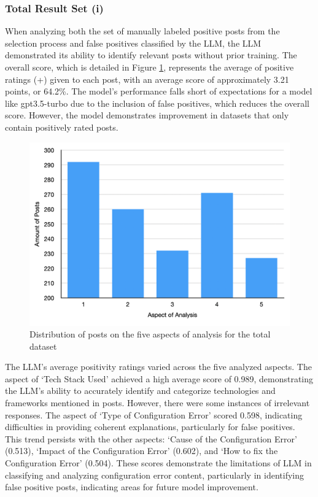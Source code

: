 \documentclass[english,bachelor]{swsLeipzig}
\begin{document}
\subsubsection{Total Result Set (i)}

When analyzing both the set of manually labeled positive posts from the selection process and false positives classified by the LLM, the LLM demonstrated its ability to identify relevant posts without prior training. The overall score, which is detailed in Figure 
\ref{fig:appendix3}, represents the average of positive ratings (+) given to each post, with an average score of approximately 3.21 points, or 64.2\%. The model's performance falls short of expectations for a model like gpt3.5-turbo due to the inclusion of false positives, which reduces the overall score. However, the model demonstrates improvement in datasets that only contain positively rated posts.

\begin{figure}[h]
  \centering
  \includegraphics[width=1\textwidth]{images/table_setA.png}
  \caption{Distribution of posts on the five aspects of analysis for the total dataset}
  \label{fig:appendix3}
\end{figure}

The LLM's average positivity ratings varied across the five analyzed aspects. The aspect of `Tech Stack Used' achieved a high average score of 0.989, demonstrating the LLM's ability to accurately identify and categorize technologies and frameworks mentioned in posts. However, there were some instances of irrelevant responses. The aspect of `Type of Configuration Error' scored 0.598, indicating difficulties in providing coherent explanations, particularly for false positives. This trend persists with the other aspects: `Cause of the Configuration Error' (0.513), `Impact of the Configuration Error' (0.602), and `How to fix the Configuration Error' (0.504). These scores demonstrate the limitations of LLM in classifying and analyzing configuration error content, particularly in identifying false positive posts, indicating areas for future model improvement.
\end{document}
